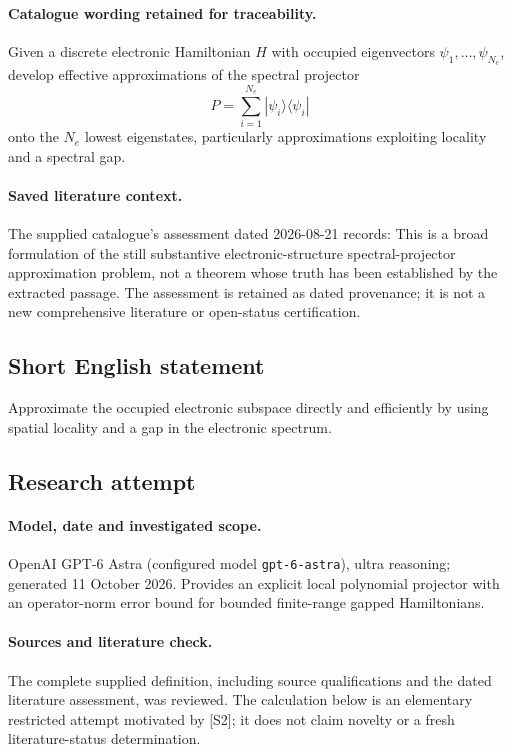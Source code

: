 \documentclass[11pt]{article}
\begin{document}
\paragraph{Catalogue wording retained for traceability.}
Given a discrete electronic Hamiltonian $H$ with occupied eigenvectors $\psi_1,\ldots,\psi_{N_e}$, develop effective approximations of the spectral projector $$P=\sum_{i=1}^{N_e}|\psi_i\rangle\langle\psi_i|$$ onto the $N_e$ lowest eigenstates, particularly approximations exploiting locality and a spectral gap.

\paragraph{Saved literature context.} The supplied catalogue's assessment dated 2026-08-21 records: This is a broad formulation of the still substantive electronic-structure spectral-projector approximation problem, not a theorem whose truth has been established by the extracted passage. The assessment is retained as dated provenance; it is not a new comprehensive literature or open-status certification.
\subsection{Short English statement}
Approximate the occupied electronic subspace directly and efficiently by using spatial locality and a gap in the electronic spectrum.
\subsection{Research attempt}
\paragraph{Model, date and investigated scope.}
OpenAI GPT-6 Astra (configured model \texttt{gpt-6-astra}), ultra reasoning; generated 11 October 2026. Provides an explicit local polynomial projector with an operator-norm error bound for bounded finite-range gapped Hamiltonians.

\paragraph{Sources and literature check.}
The complete supplied definition, including source qualifications and the dated literature assessment, was reviewed. The calculation below is an elementary restricted attempt motivated by [S2]; it does not claim novelty or a fresh literature-status determination.
\end{document}
